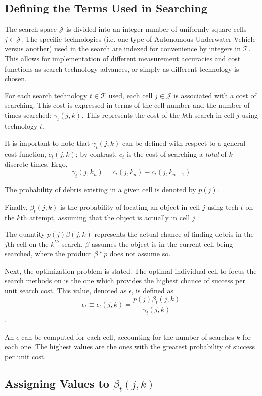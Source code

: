 \documentclass[a4paper]{article}
\begin{document}
\subsection{Defining the Terms Used in Searching}

The search space $\mathcal{J}$ is divided into an integer number of uniformly square cells $j\in\mathcal{J}$. The specific technologies (i.e. one type of Autonomous Underwater Vehicle versus another) used in the search are indexed for convenience by integers in $\mathcal{T}$. This allows for implementation of different measurement accuracies and cost functions as search technology advances, or simply as different technology is chosen. 

For each search technology $t\in\mathcal{T}$ used, each cell $j\in\mathcal{J}$ is associated with a cost of searching. This cost is expressed in terms of the cell number and the number of times searched: $\gamma_t(j,k)$. This represents the cost of the $k$th search in cell $j$ using technology $t$.

It is important to note that $\gamma_t(j,k)$ can be defined with respect to a general cost function, $c_t(j,k)$; by contrast, $c_t$ is the cost of searching  a \textit{total} of $k$ discrete times. Ergo, $$\gamma_t(j,k_n)=c_t(j,k_n)-c_t(j,k_{n-1})$$

The probability of debris existing in a given cell is denoted by $p(j)$.

Finally, $\beta_t(j,k)$ is the probability of locating an object in cell $j$ using tech $t$ on the $k$th attempt, assuming that the object is actually in cell $j$.

The quantity $p(j)\beta(j,k)$ represents the actual chance of finding debris in the $j$th cell on the $k^{th}$ search. $\beta$ assumes the object is in the current cell being searched, where the product $\beta * p$ does not assume so.

Next, the optimization problem is stated. The optimal individual cell to focus the search methods on is the one which provides the highest chance of success per unit search cost. This value, denoted as $\epsilon$, is defined as $$\epsilon_t\equiv\epsilon_t(j,k)=\frac{p(j)\beta_t(j,k)}{\gamma_t(j,k)}$$. 

An $\epsilon$ can be computed for each cell, accounting for the number of searches $k$ for each one. The highest values are the ones with the greatest probability of success per unit cost. 

\subsection{Assigning Values to $\beta_t(j,k)$}
\end{document}
